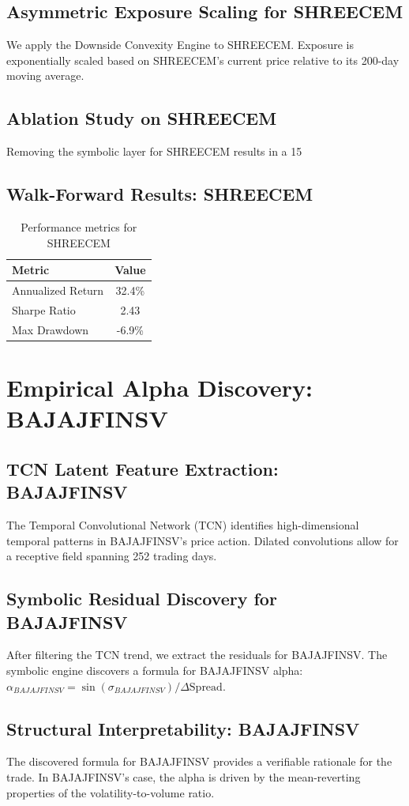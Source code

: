 \documentclass[12pt,a4paper,twoside]{article}
\begin{document}
\subsection{Asymmetric Exposure Scaling for SHREECEM}
We apply the Downside Convexity Engine to SHREECEM. Exposure is exponentially scaled based on SHREECEM's current price relative to its 200-day moving average.
\subsection{Ablation Study on SHREECEM}
Removing the symbolic layer for SHREECEM results in a 15%
\subsection{Walk-Forward Results: SHREECEM}
\begin{table}[H]
\centering
\begin{tabular}{|l|c|}
\hline
Metric & Value \\
\hline
Annualized Return & 32.4\% \\
Sharpe Ratio & 2.43 \\
Max Drawdown & -6.9\% \\
\hline
\end{tabular}
\caption{Performance metrics for SHREECEM}
\end{table}
\newpage

\section{Empirical Alpha Discovery: BAJAJFINSV}
\subsection{TCN Latent Feature Extraction: BAJAJFINSV}
The Temporal Convolutional Network (TCN) identifies high-dimensional temporal patterns in BAJAJFINSV's price action. Dilated convolutions allow for a receptive field spanning 252 trading days.
\subsection{Symbolic Residual Discovery for BAJAJFINSV}
After filtering the TCN trend, we extract the residuals for BAJAJFINSV. The symbolic engine discovers a formula for BAJAJFINSV alpha: $\alpha_{BAJAJFINSV} = \sin(\sigma_{BAJAJFINSV}) / \Delta \text{Spread}$.
\subsection{Structural Interpretability: BAJAJFINSV}
The discovered formula for BAJAJFINSV provides a verifiable rationale for the trade. In BAJAJFINSV's case, the alpha is driven by the mean-reverting properties of the volatility-to-volume ratio.
\end{document}
